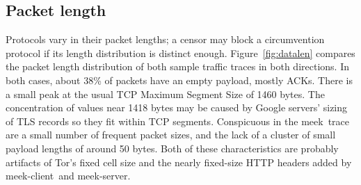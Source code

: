 \documentclass[conference]{IEEEtran}
\def\meekclient{\mbox{meek-client}}
\def\meekserver{\mbox{meek-server}}
\def\meek{meek}
\begin{document}
\subsection{Packet length}

Protocols vary in their packet lengths;
a censor may block a circumvention protocol if its length distribution
is distinct enough.
Figure~\ref{fig:datalen}
compares the packet length distribution of both sample traffic traces in both directions.
In both cases, about 38\% of packets have an empty payload, mostly ACKs.
There is a small peak at the usual TCP Maximum Segment Size
of 1460 bytes.
The concentration of values near 1418 bytes
may be caused by Google servers' sizing of TLS records so they fit within TCP segments.
Conspicuous in the \meek\ trace are a small number of
frequent packet sizes,
and the lack of a cluster of small payload lengths of around 50 bytes.
Both of these characteristics are probably artifacts
of Tor's fixed cell size and the nearly fixed-size HTTP headers
added by \meekclient\ and \meekserver.

%

\end{document}
